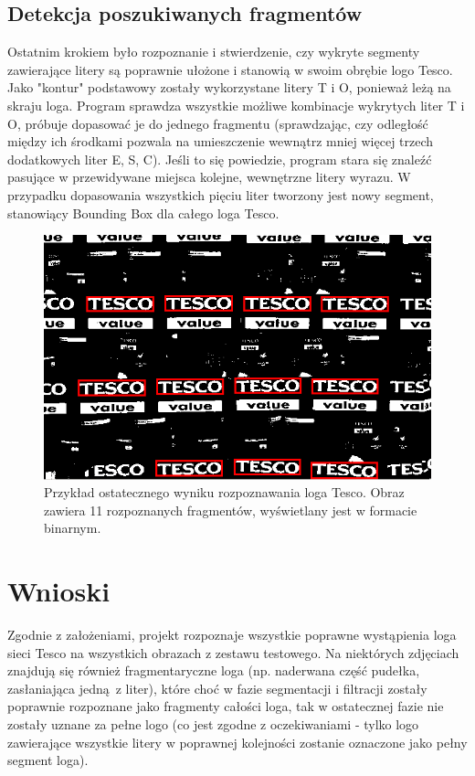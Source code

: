 \documentclass[11pt,a4paper]{article} %
\numberwithin{equation}{section} %
\numberwithin{figure}{section} %
\numberwithin{table}{section} %
\begin{document}
\subsection{Detekcja poszukiwanych fragmentów}

Ostatnim krokiem było rozpoznanie i stwierdzenie, czy wykryte segmenty zawierające litery są poprawnie ułożone i stanowią w swoim obrębie logo Tesco. Jako "kontur" podstawowy zostały wykorzystane litery T i O, ponieważ leżą na skraju loga. Program sprawdza wszystkie możliwe kombinacje wykrytych liter T i O, próbuje dopasować je do jednego fragmentu (sprawdzając, czy odległość między ich środkami pozwala na umieszczenie wewnątrz mniej więcej trzech dodatkowych liter E, S, C). Jeśli to się powiedzie, program stara się znaleźć pasujące w przewidywane miejsca kolejne, wewnętrzne litery wyrazu. W przypadku dopasowania wszystkich pięciu liter tworzony jest nowy segment, stanowiący Bounding Box dla całego loga Tesco.

\begin{figure}
	\centering
	\includegraphics[width=14cm]{pobr_proj_bin1.png}
	\caption{Przykład ostatecznego wyniku rozpoznawania loga Tesco. Obraz zawiera 11 rozpoznanych fragmentów, wyświetlany jest w formacie binarnym.}
	\label{fig:pobr_proj_bin1}
\end{figure}

\section{Wnioski}

Zgodnie z założeniami, projekt rozpoznaje wszystkie poprawne wystąpienia loga sieci Tesco na wszystkich obrazach z zestawu testowego. Na niektórych zdjęciach znajdują się również fragmentaryczne loga (np. naderwana część pudełka, zasłaniająca jedną z liter), które choć w fazie segmentacji i filtracji zostały poprawnie rozpoznane jako fragmenty całości loga, tak w ostatecznej fazie nie zostały uznane za pełne logo (co jest zgodne z oczekiwaniami - tylko logo zawierające wszystkie litery w poprawnej kolejności zostanie oznaczone jako pełny segment loga).
\end{document}
